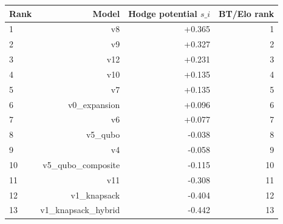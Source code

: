 \begin{tabular}{lrrr}
\toprule
Rank & Model & Hodge potential $s\_i$ & BT/Elo rank \\
\midrule
1 & v8 & +0.365 & 1 \\
2 & v9 & +0.327 & 2 \\
3 & v12 & +0.231 & 3 \\
4 & v10 & +0.135 & 4 \\
5 & v7 & +0.135 & 5 \\
6 & v0\_expansion & +0.096 & 6 \\
7 & v6 & +0.077 & 7 \\
8 & v5\_qubo & -0.038 & 8 \\
9 & v4 & -0.058 & 9 \\
10 & v5\_qubo\_composite & -0.115 & 10 \\
11 & v11 & -0.308 & 11 \\
12 & v1\_knapsack & -0.404 & 12 \\
13 & v1\_knapsack\_hybrid & -0.442 & 13 \\
\bottomrule
\end{tabular}

